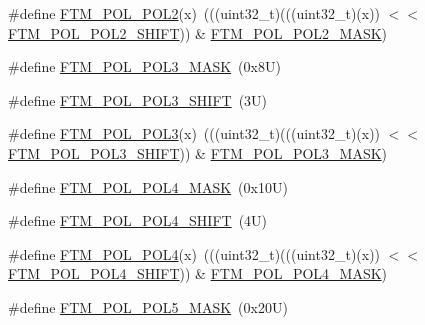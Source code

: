 \begin{DoxyCompactItemize}
\#define \mbox{\hyperlink{group___f_t_m___register___masks_gaadf9efff3951aac4c22d1650e2b29485}{F\+T\+M\+\_\+\+P\+O\+L\+\_\+\+P\+O\+L2}}(x)~(((uint32\+\_\+t)(((uint32\+\_\+t)(x)) $<$$<$ \mbox{\hyperlink{group___f_t_m___register___masks_gad025805c22c3fad213b65fc3163b8301}{F\+T\+M\+\_\+\+P\+O\+L\+\_\+\+P\+O\+L2\+\_\+\+S\+H\+I\+FT}})) \& \mbox{\hyperlink{group___f_t_m___register___masks_gaa23bd3b9b514732a3c218eece18538ae}{F\+T\+M\+\_\+\+P\+O\+L\+\_\+\+P\+O\+L2\+\_\+\+M\+A\+SK}})
\item 
\#define \mbox{\hyperlink{group___f_t_m___register___masks_ga8480025e33197e19c6b356f2ff881b51}{F\+T\+M\+\_\+\+P\+O\+L\+\_\+\+P\+O\+L3\+\_\+\+M\+A\+SK}}~(0x8\+U)
\item 
\#define \mbox{\hyperlink{group___f_t_m___register___masks_ga20265e52f72c57a978d53693190eaaf9}{F\+T\+M\+\_\+\+P\+O\+L\+\_\+\+P\+O\+L3\+\_\+\+S\+H\+I\+FT}}~(3\+U)
\item 
\#define \mbox{\hyperlink{group___f_t_m___register___masks_gaf1514ee4e7dffd41247ad736f65c4c53}{F\+T\+M\+\_\+\+P\+O\+L\+\_\+\+P\+O\+L3}}(x)~(((uint32\+\_\+t)(((uint32\+\_\+t)(x)) $<$$<$ \mbox{\hyperlink{group___f_t_m___register___masks_ga20265e52f72c57a978d53693190eaaf9}{F\+T\+M\+\_\+\+P\+O\+L\+\_\+\+P\+O\+L3\+\_\+\+S\+H\+I\+FT}})) \& \mbox{\hyperlink{group___f_t_m___register___masks_ga8480025e33197e19c6b356f2ff881b51}{F\+T\+M\+\_\+\+P\+O\+L\+\_\+\+P\+O\+L3\+\_\+\+M\+A\+SK}})
\item 
\#define \mbox{\hyperlink{group___f_t_m___register___masks_gadd5bf7f08c262fc7b3411d7b05ec46a5}{F\+T\+M\+\_\+\+P\+O\+L\+\_\+\+P\+O\+L4\+\_\+\+M\+A\+SK}}~(0x10\+U)
\item 
\#define \mbox{\hyperlink{group___f_t_m___register___masks_gafcbd3138f872abb747b64a61525715d9}{F\+T\+M\+\_\+\+P\+O\+L\+\_\+\+P\+O\+L4\+\_\+\+S\+H\+I\+FT}}~(4\+U)
\item 
\#define \mbox{\hyperlink{group___f_t_m___register___masks_ga1d5fa9d8bbd23fc355da8454e28eabf1}{F\+T\+M\+\_\+\+P\+O\+L\+\_\+\+P\+O\+L4}}(x)~(((uint32\+\_\+t)(((uint32\+\_\+t)(x)) $<$$<$ \mbox{\hyperlink{group___f_t_m___register___masks_gafcbd3138f872abb747b64a61525715d9}{F\+T\+M\+\_\+\+P\+O\+L\+\_\+\+P\+O\+L4\+\_\+\+S\+H\+I\+FT}})) \& \mbox{\hyperlink{group___f_t_m___register___masks_gadd5bf7f08c262fc7b3411d7b05ec46a5}{F\+T\+M\+\_\+\+P\+O\+L\+\_\+\+P\+O\+L4\+\_\+\+M\+A\+SK}})
\item 
\#define \mbox{\hyperlink{group___f_t_m___register___masks_ga1877e3ddc9ab240d32723fd31b1a005f}{F\+T\+M\+\_\+\+P\+O\+L\+\_\+\+P\+O\+L5\+\_\+\+M\+A\+SK}}~(0x20\+U)
\item 
$$
\end{DoxyCompactItemize}

